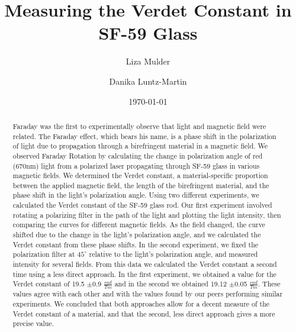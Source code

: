 \documentclass[prb,preprint]{revtex4-1}
\begin{document}

\title{Measuring the Verdet Constant in SF-59 Glass}


\author{Liza Mulder}


\author{Danika Luntz-Martin}


\date{\today}



\begin{abstract}

Faraday was the first to experimentally observe that light and magnetic field were related. The Faraday effect, which bears his name, is a phase shift in the polarization of light due to propagation through a birefringent material in a magnetic field. We observed Faraday Rotation by calculating the change in polarization angle of red (670nm) light from a polarized laser propagating through SF-59 glass in various magnetic fields. We determined the Verdet constant, a material-specific proportion between the applied magnetic field, the length of the birefringent material, and the phase shift in the light's polarization angle. Using two different experiments, we calculated the Verdet constant of the SF-59 glass rod. Our first experiment involved rotating a polarizing filter in the path of the light and plotting the light intensity, then comparing the curves for different magnetic fields.  As the field changed, the curve shifted due to the change in the light's polarization angle, and we calculated the Verdet constant from these phase shifts.  In the second experiment, we fixed the polarization filter at $45^{\circ}$ relative to the light's polarization angle, and measured intensity for several fields.  From this data we calculated the Verdet constant a second time using a less direct approach.  In the first experiment, we obtained a value for the Verdet constant of 19.5 $\pm$0.9 $\frac{rad}{Tm}$ and in the second we obtained 19.12 $\pm$0.05 $\frac{rad}{Tm}$. These values agree with each other and with the values found by our peers performing similar experiments. We concluded that both approaches allow for a decent measure of the Verdet constant of a material, and that the second, less direct approach gives a more precise value. 

\end{abstract}
\end{document}

